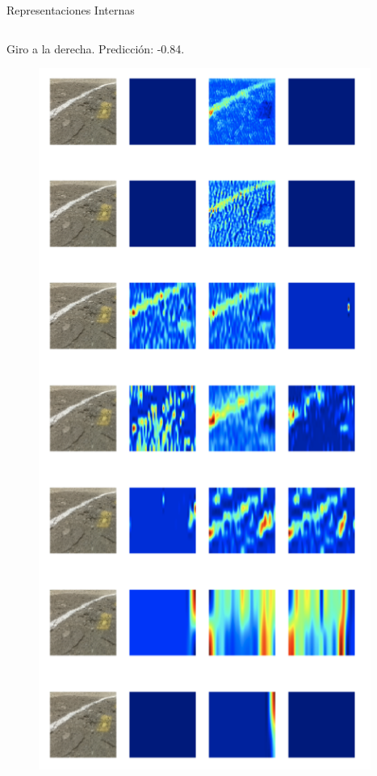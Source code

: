 \documentclass[10pt]{beamer}
\begin{document}
\begin{frame}{Representaciones Internas}
\begin{columns}
        \begin{column}{0.31\textwidth}
            Giro a la derecha. Predicción: \alert{-0.84}.
            \begin{figure}[!h] 
                \centering
                \includegraphics[width=0.97\textwidth]{../img/predder}
            \end{figure}
        \end{column}
    \end{columns}
\end{frame}
\end{document}
